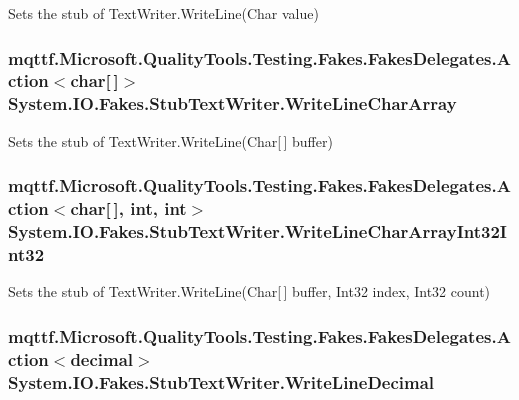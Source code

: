 Sets the stub of Text\-Writer.\-Write\-Line(\-Char value)

\hypertarget{class_system_1_1_i_o_1_1_fakes_1_1_stub_text_writer_a5c7a9391af6452fe3af9139d719c26ac}{
\subsubsection[{Write\-Line\-Char\-Array}]{\setlength{\rightskip}{0pt plus 5cm}mqttf.\-Microsoft.\-Quality\-Tools.\-Testing.\-Fakes.\-Fakes\-Delegates.\-Action$<$char\mbox{[}$\,$\mbox{]}$>$ System.\-I\-O.\-Fakes.\-Stub\-Text\-Writer.\-Write\-Line\-Char\-Array}}\label{class_system_1_1_i_o_1_1_fakes_1_1_stub_text_writer_a5c7a9391af6452fe3af9139d719c26ac}


Sets the stub of Text\-Writer.\-Write\-Line(\-Char\mbox{[}$\,$\mbox{]} buffer)

\hypertarget{class_system_1_1_i_o_1_1_fakes_1_1_stub_text_writer_a7fd931eb86cd3c0887fb4a3f8ea921d1}{
\subsubsection[{Write\-Line\-Char\-Array\-Int32\-Int32}]{\setlength{\rightskip}{0pt plus 5cm}mqttf.\-Microsoft.\-Quality\-Tools.\-Testing.\-Fakes.\-Fakes\-Delegates.\-Action$<$char\mbox{[}$\,$\mbox{]}, int, int$>$ System.\-I\-O.\-Fakes.\-Stub\-Text\-Writer.\-Write\-Line\-Char\-Array\-Int32\-Int32}}\label{class_system_1_1_i_o_1_1_fakes_1_1_stub_text_writer_a7fd931eb86cd3c0887fb4a3f8ea921d1}


Sets the stub of Text\-Writer.\-Write\-Line(\-Char\mbox{[}$\,$\mbox{]} buffer, Int32 index, Int32 count)

\hypertarget{class_system_1_1_i_o_1_1_fakes_1_1_stub_text_writer_a31631fe1c540c253cdac4d009973f03f}{
\subsubsection[{Write\-Line\-Decimal}]{\setlength{\rightskip}{0pt plus 5cm}mqttf.\-Microsoft.\-Quality\-Tools.\-Testing.\-Fakes.\-Fakes\-Delegates.\-Action$<$decimal$>$ System.\-I\-O.\-Fakes.\-Stub\-Text\-Writer.\-Write\-Line\-Decimal}}\label{class_system_1_1_i_o_1_1_fakes_1_1_stub_text_writer_a31631fe1c540c253cdac4d009973f03f}


